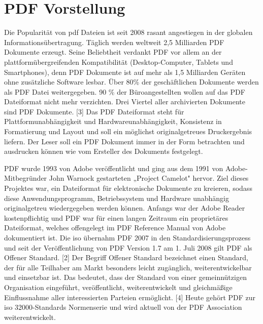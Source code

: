 \section{PDF Vorstellung}
Die Popularität von \gls{pdf} Dateien ist seit 2008 rasant angestiegen in der globalen Informationsübertragung. Täglich werden weltweit 2,5 Milliarden PDF Dokumente erzeugt. Seine Beliebtheit verdankt PDF vor allem an der plattformübergreifenden Kompatibilität (Desktop-Computer, Tablets und Smartphones), denn PDF Dokumente ist auf mehr als 1,5 Milliarden Geräten ohne zusätzliche Software lesbar. Über 80\% der geschäftlichen Dokumente werden als PDF Datei weitergegeben. \cite{formilo} 90 \% der Büroangestellten wollen auf das PDF Dateiformat nicht mehr verzichten. Drei Viertel aller archivierten Dokumente sind PDF Dokumente. [3] Das PDF Dateiformat steht für Plattformunabhängigkeit und Hardwareunabhängigkeit, Konsistenz in Formatierung und Layout und soll ein möglichst originalgetreues Druckergebnis liefern. Der Leser soll ein PDF Dokument immer in der Form betrachten und ausdrucken können wie vom Ersteller des Dokuments festgelegt.
\par
PDF wurde 1993 von Adobe veröffentlicht und ging aus dem 1991 von Adobe-Mitbegründer John Warnock gestarteten „Project Camelot" hervor. Ziel dieses Projektes war, ein Dateiformat für elektronische Dokumente zu kreieren, sodass diese Anwendungsprogramm, Betriebssystem und Hardware unabhängig originalgetreu wiedergegeben werden können. Anfangs war der Adobe Reader kostenpflichtig und PDF war für einen langen Zeitraum ein proprietäres Dateiformat, welches offengelegt im PDF Reference Manual von Adobe dokumentiert ist. Die \gls{iso} übernahm PDF 2007 in den Standardisierungsprozess und seit der Veröffentlichung von PDF Version 1.7 am 1. Juli 2008 gilt PDF als Offener Standard. [2] Der Begriff Offener Standard bezeichnet einen Standard, der für alle Teilhaber am Markt besonders leicht zugänglich, weiterentwickelbar und einsetzbar ist. Das bedeutet, dass der Standard von einer gemeinnützigen Organisation eingeführt, veröffentlicht, weiterentwickelt und gleichmäßige Einflussnahme aller interessierten Parteien ermöglicht. [4] Heute gehört PDF zur \gls{iso} 32000-Standards Normenserie und wird aktuell von der PDF Association weiterentwickelt.
